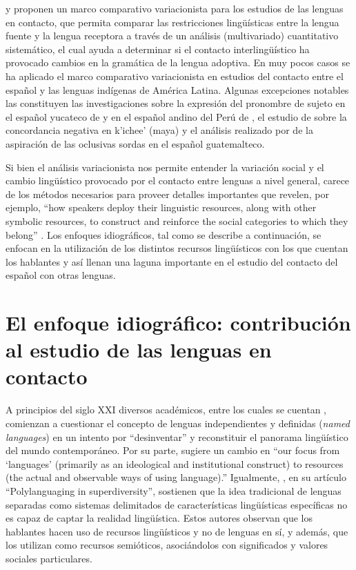 \documentclass[output=paper]{langscibook}
\begin{document}
\citet{PoplackLevey2010} y \citet{PoplackEtAl2012} proponen un marco comparativo variacionista para los estudios de las lenguas en contacto, que permita comparar las restricciones lingüísticas entre la lengua fuente y la lengua receptora a través de un análisis (multivariado) cuantitativo sistemático, el cual ayuda a determinar si el contacto interlingüístico ha provocado cambios en la gramática de la lengua adoptiva. En muy pocos casos se ha aplicado el marco comparativo variacionista en estudios del contacto entre el español y las lenguas indígenas de América Latina. Algunas excepciones notables las constituyen las investigaciones sobre la expresión del pronombre de sujeto en el español yucateco de \citet{Michnowicz2015} y en el español andino del Perú de \citet{Cerrón-Palomino2019}, el estudio de \citet{Romero2015} sobre la concordancia negativa en k’ichee’ (maya) y el análisis realizado por \citet{McKinnon2020} de la aspiración de las oclusivas sordas en el español guatemalteco.

Si bien el análisis variacionista nos permite entender la variación social y el cambio lingüístico provocado por el contacto entre lenguas a nivel general, carece de los métodos necesarios para proveer detalles importantes que revelen, por ejemplo, “how speakers deploy their linguistic resources, along with other symbolic resources, to construct and reinforce the social categories to which they belong” \citep[135]{Bayley2002}. Los enfoques idiográficos, tal como se describe a continuación, se enfocan en la utilización de los distintos recursos lingüísticos con los que cuentan los hablantes y así llenan una laguna importante en el estudio del contacto del español con otras lenguas.


\section{El enfoque idiográfico: contribución al estudio de las lenguas en contacto}


A principios del siglo XXI diversos académicos, entre los cuales se cuentan  \citet{MakoniPennycook2006}, comienzan a cuestionar el concepto de lenguas independientes y definidas (\emph {named languages}) en un intento por “desinventar” y reconstituir el panorama lingüístico del mundo contemporáneo. Por su parte, \citet[102]{Blommaert2010} sugiere un cambio en “our focus from ‘languages’ (primarily as an ideological and institutional construct) to resources (the actual and observable ways of using language).” Igualmente, \citet{JørgensenEtAl2011}, en su artículo “Polylanguaging in superdiversity”, sostienen que la idea tradicional de lenguas separadas como sistemas delimitados de características lingüísticas específicas no es capaz de captar la realidad lingüística. Estos autores observan que los hablantes hacen uso de recursos lingüísticos y no de lenguas en sí, y además, que los utilizan como recursos semióticos, asociándolos con significados y valores sociales particulares.
\end{document}
